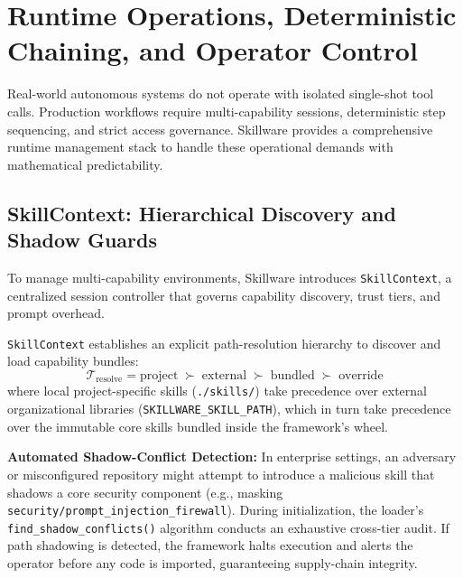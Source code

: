 
\section{Runtime Operations, Deterministic Chaining, and Operator Control}
\label{sec:runtime_operations}

Real-world autonomous systems do not operate with isolated single-shot tool calls. Production workflows require multi-capability sessions, deterministic step sequencing, and strict access governance. Skillware provides a comprehensive runtime management stack to handle these operational demands with mathematical predictability.

\subsection{SkillContext: Hierarchical Discovery and Shadow Guards}
\label{subsec:skillcontext}

To manage multi-capability environments, Skillware introduces \texttt{SkillContext}, a centralized session controller that governs capability discovery, trust tiers, and prompt overhead. 

\texttt{SkillContext} establishes an explicit path-resolution hierarchy to discover and load capability bundles:
\begin{equation}
\label{eq:tier_resolution}
\mathcal{T}_{\text{resolve}} = \text{project} \;\succ\; \text{external} \;\succ\; \text{bundled} \;\succ\; \text{override}
\end{equation}
where local project-specific skills (\texttt{./skills/}) take precedence over external organizational libraries (\texttt{SKILLWARE\_SKILL\_PATH}), which in turn take precedence over the immutable core skills bundled inside the framework's wheel.

\textbf{Automated Shadow-Conflict Detection:} In enterprise settings, an adversary or misconfigured repository might attempt to introduce a malicious skill that shadows a core security component (e.g., masking \texttt{security/prompt\_injection\_firewall}). During initialization, the loader's \texttt{find\_shadow\_conflicts()} algorithm conducts an exhaustive cross-tier audit. If path shadowing is detected, the framework halts execution and alerts the operator before any code is imported, guaranteeing supply-chain integrity.


